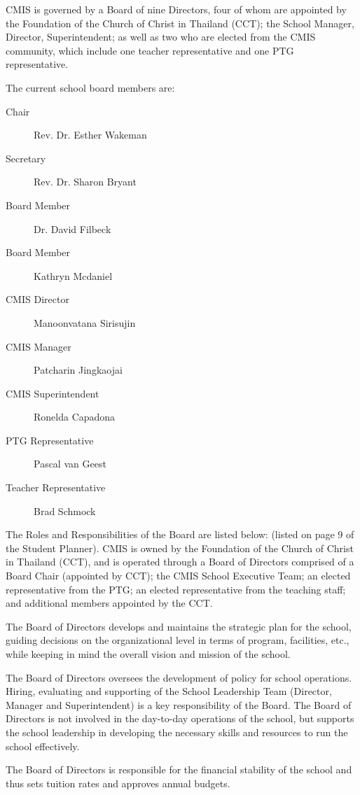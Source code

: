 \documentclass{report}
\begin{document}
CMIS is governed by a Board of nine Directors, four of whom are appointed by the Foundation of the Church of Christ in Thailand (CCT);  the School Manager, Director, Superintendent; as well as two who are elected from the CMIS community, which include one teacher representative and one PTG representative. 

The current school board members are: 
\begin{description}
\item[Chair] Rev. Dr. Esther Wakeman 
\item[Secretary] Rev. Dr. Sharon Bryant
\item[Board Member] Dr. David Filbeck 
\item[Board Member] Kathryn Mcdaniel
\item[CMIS Director] Manoonvatana Sirisujin 
\item[CMIS Manager] Patcharin Jingkaojai 
\item[CMIS Superintendent] Ronelda Capadona 
\item[PTG Representative] Pascal van Geest
\item[Teacher Representative] Brad Schmock
\end{description}
The Roles and Responsibilities of the Board are listed below:  (listed on page 9 of the Student Planner).
CMIS is owned by the Foundation of the Church of Christ in Thailand (CCT), and is operated through a Board of Directors comprised of a Board Chair (appointed by CCT); the CMIS School Executive Team; an elected representative from the PTG; an elected representative from the teaching staff; and additional members appointed by the CCT.

The Board of Directors develops and maintains the strategic plan for the school, guiding
decisions on the organizational level in terms of program, facilities, etc., while keeping in
mind the overall vision and mission of the school.

The Board of Directors oversees the development of policy for school operations. Hiring, evaluating and supporting of the School Leadership Team (Director, Manager and Superintendent) is a key responsibility of the Board. The Board of Directors is not involved in the day-to-day operations of the school, but supports the school leadership in developing the necessary skills and resources to run the school effectively.

The Board of Directors is responsible for the financial stability of the school and thus sets tuition rates and approves annual budgets.
\end{document}
